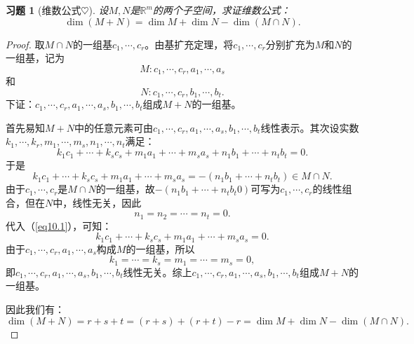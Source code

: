 \documentclass[UTF8]{ctexart}
\newtheorem{ex}[thm]{习题}
\begin{document}
\begin{ex}[维数公式$\heartsuit $]
设$M, N$是$\mathbb{R}^m$的两个子空间，求证维数公式：
\[
\dim(M+N) = \dim M + \dim N - \dim (M \cap N).
\]
\end{ex}
\begin{proof}
取$M \cap N$的一组基$c_1, \cdots, c_r$。由基扩充定理，将$c_1, \cdots, c_r$分别扩充为$M$和$N$的一组基，记为
\[
M: c_1, \cdots, c_r, a_1, \cdots, a_s
\]
和
\[
N: c_1, \cdots, c_r, b_1, \cdots, b_t.
\]
下证：$c_1, \cdots, c_r, a_1, \cdots, a_s, b_1, \cdots, b_t$组成$M+N$的一组基。
\

首先易知$M+N$中的任意元素可由$c_1, \cdots, c_r, a_1, \cdots, a_s, b_1, \cdots, b_t$线性表示。其次设实数$k_1, \cdots, k_r, m_1, \cdots, m_s, n_1, \cdots, n_t$满足：
\begin{equation} \label{eq10.1}
k_1c_1 + \cdots + k_sc_s + m_1 a_1 + \cdots + m_s a_s + n_1 b_1 + \cdots + n_tb_t = 0.
\end{equation}
于是
\[
k_1c_1 + \cdots + k_sc_s + m_1 a_1 + \cdots + m_s a_s = -(n_1 b_1 + \cdots + n_tb_t) \in M \cap N.
\]
由于$c_1, \cdots, c_r$是$M \cap N$的一组基，故$-(n_1 b_1 + \cdots + n_tb_t0)$可写为$c_1, \cdots, c_r$的线性组合，但在$N$中，线性无关，因此
\[
n_1 = n_2 = \cdots = n_t = 0.
\]
代入（\ref{eq10.1}），可知：
\[
k_1c_1 + \cdots + k_sc_s + m_1 a_1 + \cdots + m_s a_s = 0.
\]
由于$c_1, \cdots, c_r, a_1, \cdots, a_s$构成$M$的一组基，所以
\[
k_1 = \cdots = k_s = m_1 = \cdots =m_s = 0,
\]
即$c_1, \cdots, c_r, a_1, \cdots, a_s, b_1, \cdots, b_t$线性无关。综上$c_1, \cdots, c_r, a_1, \cdots, a_s, b_1, \cdots, b_t$组成$M+N$的一组基。
\

因此我们有：
\[
\dim(M+N) = r+s+t = (r+s) + (r+t) - r = \dim M + \dim N - \dim (M \cap N).
\]
\end{proof}



\clearpage
\listofchanges
\end{document}
